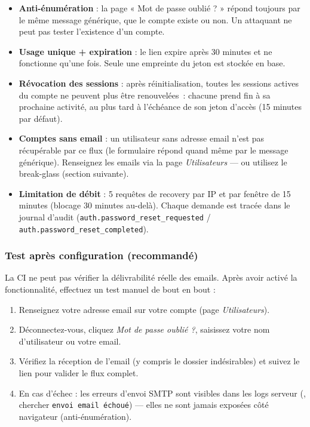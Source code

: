 \documentclass[a4paper,11pt,oneside]{article}
\begin{document}
\begin{itemize}
    \item \textbf{Anti-énumération} : la page « Mot de passe oublié ? » répond toujours par le même message générique, que le compte existe ou non. Un attaquant ne peut pas tester l'existence d'un compte.
    \item \textbf{Usage unique + expiration} : le lien expire après 30 minutes et ne fonctionne qu'une fois. Seule une empreinte du jeton est stockée en base.
    \item \textbf{Révocation des sessions} : après réinitialisation, toutes les sessions actives du compte ne peuvent plus être renouvelées~: chacune prend fin à sa prochaine activité, au plus tard à l'échéance de son jeton d'accès (15 minutes par défaut).
    \item \textbf{Comptes sans email} : un utilisateur sans adresse email n'est pas récupérable par ce flux (le formulaire répond quand même par le message générique). Renseignez les emails via la page \emph{Utilisateurs} — ou utilisez le break-glass (section suivante).
    \item \textbf{Limitation de débit} : 5 requêtes de recovery par IP et par fenêtre de 15 minutes (blocage 30 minutes au-delà). Chaque demande est tracée dans le journal d'audit (\texttt{auth.password\_reset\_requested} / \texttt{auth.password\_reset\_completed}).
\end{itemize}

\subsubsection{Test après configuration (recommandé)}

La CI ne peut pas vérifier la délivrabilité réelle des emails. Après avoir activé la fonctionnalité, effectuez un test manuel de bout en bout :

\begin{enumerate}
    \item Renseignez votre adresse email sur votre compte (page \emph{Utilisateurs}).
    \item Déconnectez-vous, cliquez \emph{Mot de passe oublié ?}, saisissez votre nom d'utilisateur ou votre email.
    \item Vérifiez la réception de l'email (y compris le dossier indésirables) et suivez le lien pour valider le flux complet.
    \item En cas d'échec : les erreurs d'envoi SMTP sont visibles dans les logs serveur (, chercher \texttt{envoi email échoué}) — elles ne sont jamais exposées côté navigateur (anti-énumération).
\end{enumerate}
\end{document}
